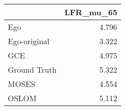 \begin{tabular}{lr}
\toprule
{} & LFR_mu_65 \\
\midrule
Ego          &     4.796 \\
Ego-original &     3.322 \\
GCE          &     4.975 \\
Ground Truth &     5.322 \\
MOSES        &     4.554 \\
OSLOM        &     5.112 \\
\bottomrule
\end{tabular}
